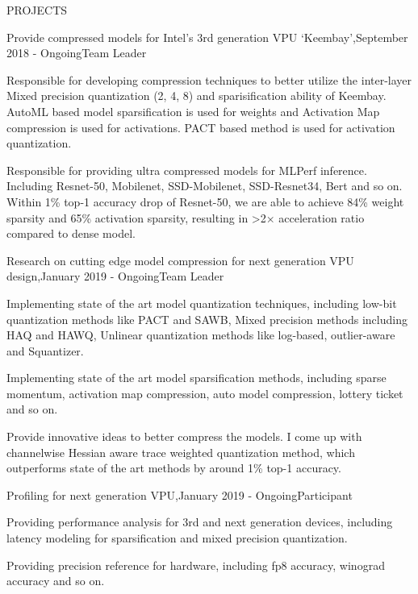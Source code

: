 \documentclass{resume} %
\begin{document}
\begin{rSection}{PROJECTS}

\begin{rSubsection}{Provide compressed models for Intel’s 3rd generation VPU ‘Keembay’,}{September 2018 - Ongoing}{Team Leader}{}
\item Responsible for developing compression techniques to better utilize the inter-layer Mixed precision quantization (2, 4, 8) and sparisification ability of Keembay. 
\\ AutoML based model sparsification is used for weights and Activation Map compression is used for activations. PACT based method is used for activation quantization.
\item Responsible for providing ultra compressed models for MLPerf inference. Including Resnet-50, Mobilenet, SSD-Mobilenet, SSD-Resnet34, Bert and so on. 
\\Within 1\% top-1 accuracy drop of Resnet-50, we are able to achieve 84\% weight sparsity and 65\% activation sparsity, resulting in \textgreater 2$\times$ acceleration ratio compared to dense model.

\end{rSubsection} 



\begin{rSubsection}{Research on cutting edge model compression for next generation VPU design,}{January 2019 -  Ongoing}{Team Leader}{}
\item Implementing state of the art model quantization techniques, including low-bit quantization methods like PACT and SAWB,  Mixed precision methods including HAQ and HAWQ, Unlinear quantization methods like log-based, outlier-aware and Squantizer. 
\item Implementing state of the art model sparsification methods, including sparse momentum, activation map compression, auto model compression, lottery ticket and so on.
\item Provide innovative ideas to better compress the models. I come up with channelwise Hessian aware trace weighted quantization method, which outperforms state of the art methods by around 1\% top-1 accuracy.

\end{rSubsection}


\begin{rSubsection}{Profiling for next generation VPU,}{January 2019 -  Ongoing}{Participant}{}
\item Providing performance analysis for 3rd and next generation devices, including latency modeling for sparsification and mixed precision quantization.
\item Providing precision reference for hardware, including fp8 accuracy, winograd accuracy and so on.
\end{rSubsection}


\end{rSection}
\end{document}
